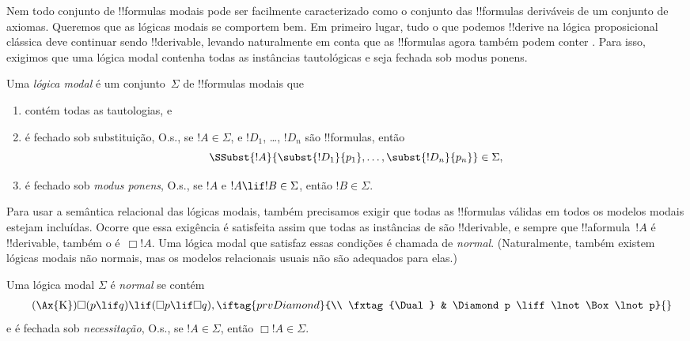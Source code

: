 \documentclass[../../../include/open-logic-section]{subfiles}
\begin{document}


Nem todo conjunto de !!{formula}s modais pode ser facilmente caracterizado
como o conjunto das !!{formula}s deriváveis de um conjunto de axiomas.
Queremos que as lógicas modais se comportem bem. Em primeiro lugar, tudo o que
podemos !!{derive} na lógica proposicional clássica deve continuar sendo
!!{derivable}, levando naturalmente em conta que as !!{formula}s agora também
podem conter . Para isso, exigimos que uma
lógica modal contenha todas as instâncias tautológicas e seja fechada sob
modus ponens.

\begin{defn}
  Uma \emph{lógica modal} é um conjunto~$\Sigma$ de !!{formula}s modais que
  \begin{enumerate}
  \item contém todas as tautologias, e
  \item é fechado sob substituição, O.s.\@, se $!A \in \Sigma$, e
    $!D_1$, \dots, $!D_n$ são !!{formula}s, então
    \[
    \SSubst{!A}{\subst{!D_1}{p_1}, \dots, \subst{!D_n}{p_n}} \in \Sigma,
    \]
    \item é fechado sob \emph{modus ponens}, O.s.\@, se $!A$ e
      $!A \lif !B \in \Sigma$, então $!B \in \Sigma$.
  \end{enumerate}
\end{defn}

Para usar a semântica relacional das lógicas modais, também precisamos exigir
que todas as !!{formula}s válidas em todos os modelos modais estejam
incluídas. Ocorre que essa exigência é satisfeita assim que todas as instâncias
de  são !!{derivable}, e sempre que
!!a{formula}~$!A$ é !!{derivable}, também o é~$\Box !A$. Uma lógica modal que
satisfaz essas condições é chamada de \emph{normal}. (Naturalmente, também
existem lógicas modais não normais, mas os modelos relacionais usuais não são
adequados para elas.)

\begin{defn}
  Uma lógica modal $\Sigma$ é \emph{normal} se contém
  \begin{align*}
    \tag{\Ax{K}} & \Box(p \lif q) \lif (\Box p \lif \Box q),
    \iftag{prvDiamond}{\\
      \tag{\Dual} & \Diamond p \liff \lnot\Box\lnot p}{}
  \end{align*}
  e é fechada sob \emph{necessitação}, O.s.\@, se $!A \in \Sigma$, então
  $\Box !A \in \Sigma$.
\end{defn}
\end{document}
